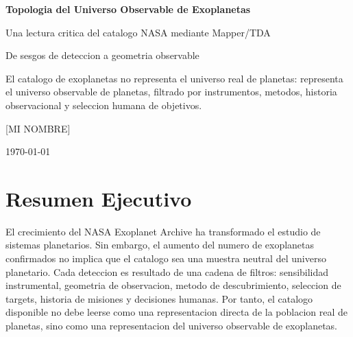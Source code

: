\documentclass[11pt]{article}
\newcommand{\ProjectAuthor}{[MI NOMBRE]}
\begin{document}
\hypersetup{pageanchor=false}

\begin{titlepage}

  \vspace*{2.0cm}
  {\color{white}\Huge\bfseries Topologia del Universo Observable de Exoplanetas\par}
  \vspace{0.4cm}
  {\color{white!80}\Large Una lectura critica del catalogo NASA mediante Mapper/TDA\par}
  \vspace{0.25cm}
  {\color{white!65}\large De sesgos de deteccion a geometria observable\par}
  \vfill
  \begin{minipage}{0.78\linewidth}
    \color{white!88}
    \large
    El catalogo de exoplanetas no representa el universo real de planetas:
    representa el universo observable de planetas, filtrado por instrumentos,
    metodos, historia observacional y seleccion humana de objetivos.
  \end{minipage}
  \vfill
  {\color{white!75}\ProjectAuthor\par}
  {\color{white!55}\today\par}
\end{titlepage}

\tableofcontents
\clearpage
{}
\hypersetup{pageanchor=true}

\section{Resumen Ejecutivo}

El crecimiento del NASA Exoplanet Archive ha transformado el estudio de sistemas planetarios. Sin embargo, el aumento del numero de exoplanetas confirmados no implica que el catalogo sea una muestra neutral del universo planetario. Cada deteccion es resultado de una cadena de filtros: sensibilidad instrumental, geometria de observacion, metodo de descubrimiento, seleccion de targets, historia de misiones y decisiones humanas. Por tanto, el catalogo disponible no debe leerse como una representacion directa de la poblacion real de planetas, sino como una representacion del universo observable de exoplanetas.
\end{document}

